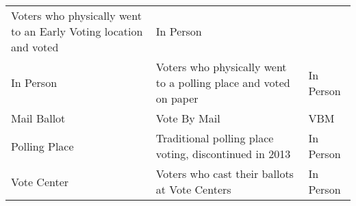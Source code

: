 \documentclass[]{article}
\begin{document}
\begin{longtable}[]{@{}lll@{}}
\begin{minipage}[t]{0.42\columnwidth}
Voters who physically went to an Early Voting location and voted\strut
\end{minipage} & \begin{minipage}[t]{0.18\columnwidth}\raggedright\strut
In Person\strut
\end{minipage}\tabularnewline
\begin{minipage}[t]{0.22\columnwidth}\raggedright\strut
In Person\strut
\end{minipage} & \begin{minipage}[t]{0.42\columnwidth}\raggedright\strut
Voters who physically went to a polling place and voted on paper\strut
\end{minipage} & \begin{minipage}[t]{0.18\columnwidth}\raggedright\strut
In Person\strut
\end{minipage}\tabularnewline
\begin{minipage}[t]{0.22\columnwidth}\raggedright\strut
Mail Ballot\strut
\end{minipage} & \begin{minipage}[t]{0.42\columnwidth}\raggedright\strut
Vote By Mail\strut
\end{minipage} & \begin{minipage}[t]{0.18\columnwidth}\raggedright\strut
VBM\strut
\end{minipage}\tabularnewline
\begin{minipage}[t]{0.22\columnwidth}\raggedright\strut
Polling Place\strut
\end{minipage} & \begin{minipage}[t]{0.42\columnwidth}\raggedright\strut
Traditional polling place voting, discontinued in 2013\strut
\end{minipage} & \begin{minipage}[t]{0.18\columnwidth}\raggedright\strut
In Person\strut
\end{minipage}\tabularnewline
\begin{minipage}[t]{0.22\columnwidth}\raggedright\strut
Vote Center\strut
\end{minipage} & \begin{minipage}[t]{0.42\columnwidth}\raggedright\strut
Voters who cast their ballots at Vote Centers\strut
\end{minipage} & \begin{minipage}[t]{0.18\columnwidth}\raggedright\strut
In Person\strut
\end{minipage}\tabularnewline
\bottomrule
\end{longtable}
\end{document}
